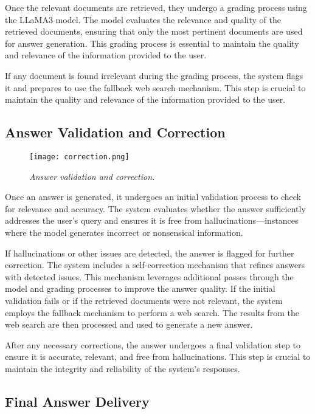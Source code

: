 Once the relevant documents are retrieved, they undergo a grading process using the LLaMA3 model. The model evaluates the relevance and quality of the retrieved documents, ensuring that only the most pertinent documents are used for answer generation. This grading process is essential to maintain the quality and relevance of the information provided to the user.

If any document is found irrelevant during the grading process, the system flags it and prepares to use the fallback web search mechanism. This step is crucial to maintain the quality and relevance of the information provided to the user.

\subsection{Answer Validation and Correction}

\begin{figure}[H]
    \centering
    \texttt{[image: correction.png]}
    \caption{
        \it{Answer validation and correction.}
    }
\end{figure}

Once an answer is generated, it undergoes an initial validation process to check for relevance and accuracy. The system evaluates whether the answer sufficiently addresses the user's query and ensures it is free from hallucinations—instances where the model generates incorrect or nonsensical information.

If hallucinations or other issues are detected, the answer is flagged for further correction. The system includes a self-correction mechanism that refines answers with detected issues. This mechanism leverages additional passes through the model and grading processes to improve the answer quality. If the initial validation fails or if the retrieved documents were not relevant, the system employs the fallback mechanism to perform a web search. The results from the web search are then processed and used to generate a new answer.

After any necessary corrections, the answer undergoes a final validation step to ensure it is accurate, relevant, and free from hallucinations. This step is crucial to maintain the integrity and reliability of the system's responses.

\subsection{Final Answer Delivery}

